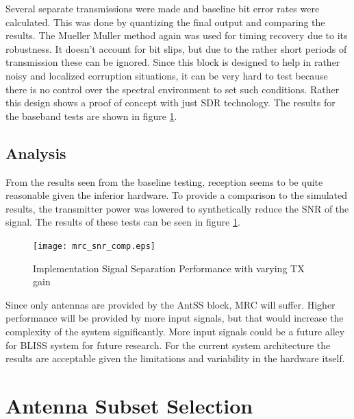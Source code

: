 Several separate transmissions were made and baseline bit error rates were calculated.  This was done by quantizing the final output and comparing the results.  The Mueller Muller method again was used for timing recovery due to its robustness.  It doesn't account for bit slips, but due to the rather short periods of transmission these can be ignored.  Since this block is designed to help in rather noisy and localized corruption situations, it can be very hard to test because there is no control over the spectral environment to set such conditions.  Rather this design shows a proof of concept with just SDR technology.  The results for the baseband tests are shown in figure \ref{ssep_snr_tests}.\\


\subsection{Analysis}

From the results seen from the baseline testing, reception seems to be quite reasonable given the inferior hardware. To provide a comparison to the simulated results, the transmitter power was lowered to synthetically reduce the SNR of the signal.  The results of these tests can be seen in figure \ref{ssep_snr_tests}.   

\begin{figure}\label{ssep_snr_tests}
\centering
\texttt{[image: mrc\_snr\_comp.eps]} %
\caption{Implementation Signal Separation Performance with varying TX gain}
\end{figure}

Since only antennas are provided by the AntSS block, MRC will suffer.  Higher performance will be provided by more input signals, but that would increase the complexity of the system significantly.  More input signals could be a future alley for BLISS system for future research.  For the current system architecture the results are acceptable given the limitations and variability in the hardware itself.\\

\section{Antenna Subset Selection}

